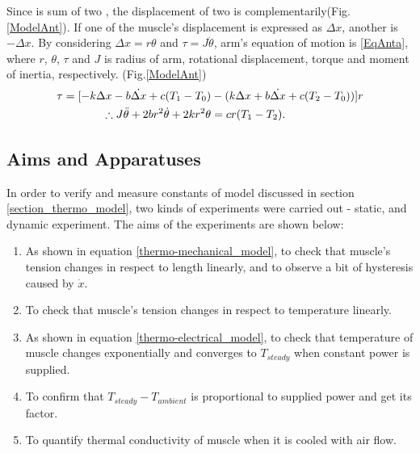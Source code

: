 Since \anta is sum of two \scpnospace, the displacement of two \scp is complementarily(Fig.\ref{ModelAnt}). If one of the muscle's displacement is expressed as $\Delta{x}$, another is $-\Delta{x}$. By considering $\Delta{x}=r\theta$ and $\tau=J\ddot{\theta}$, arm's equation of motion is \eqref{EqAnta}, where $r$, $\theta$, $\tau$ and $J$ is radius of arm, rotational displacement, torque and moment of inertia, respectively.
(Fig.\ref{ModelAnt})
\begin{align}
\tau = [-k\Delta x-b\dot{\Delta x}+c(T_1-T_0) & - (k\Delta x+b\dot{\Delta x}+c(T_2-T_0))]r \notag \\
\therefore J\ddot{\theta}+2br^2\dot{\theta}+2kr^2\theta & =cr(T_1-T_2). \label{EqAnta}
\end{align}

\subsection{Aims and Apparatuses}\label{section_aimsappa}
In order to verify and measure constants of model discussed in section \ref{section_thermo_model}, two kinds of experiments were carried out - static, and dynamic experiment. The aims of the experiments are shown below:

\begin{enumerate} 
\item As shown in equation \eqref{thermo-mechanical_model}, to check that muscle's tension changes in respect to length linearly, and to observe a bit of hysteresis caused by $\dot{x}$.
\item To check that muscle's tension changes in respect to temperature linearly.
\item As shown in equation \eqref{thermo-electrical_model}, to check that temperature of muscle changes exponentially and converges to $T_{steady}$ when constant power is supplied.
\item To confirm that $T_{steady}-T_{ambient}$ is proportional to supplied power and get its factor. 
\item To quantify thermal conductivity of muscle when it is cooled with air flow.
\end{enumerate}

